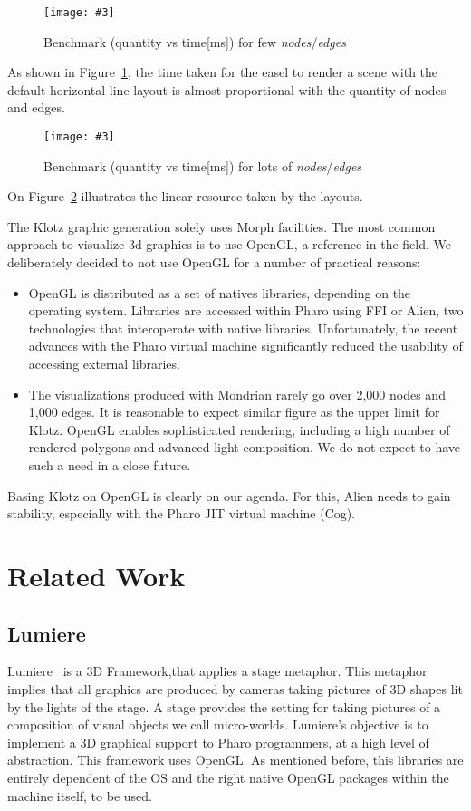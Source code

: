 \documentclass{sig-alternate}
\newcommand{\ab}[1]{\nb{Alexandre}{blue}{#1}}
\newcommand{\fig}[4]{
	\begin{figure}[#1]
		\centering
		\texttt{[image: \#3]}
		\caption{\label{fig:#3}#4}
	\end{figure}}
\newcommand{\seclabel}[1]{\label{sec:#1}}
\newcommand{\figref}[1]{Figure~\ref{fig:#1}}
\begin{document}
\fig{}{0.5}{graph1}{Benchmark (quantity vs time[ms]) for few \emph{nodes}/\emph{edges}} 

As shown in \figref{graph1}, the time taken for the easel to render a scene with the default horizontal line layout is almost proportional with the quantity of nodes and edges. %

\fig{}{0.5}{graph2}{Benchmark (quantity vs time[ms]) for lots of \emph{nodes}/\emph{edges}}

On \figref{graph2} illustrates the linear resource taken by the layouts.


The Klotz graphic generation solely uses Morph facilities. The most common approach to visualize 3d graphics is to use OpenGL, a reference in the field. We deliberately decided to not use OpenGL for a number of practical reasons:

\begin{itemize}
\item OpenGL is distributed as a set of natives libraries, depending on the operating system. Libraries are accessed within Pharo using FFI or Alien, two technologies that interoperate with native libraries. Unfortunately, the recent advances with the Pharo virtual machine significantly reduced the usability of accessing external libraries.

\item The visualizations produced with Mondrian rarely go over 2,000 nodes and 1,000 edges. It is reasonable to expect similar figure as the upper limit for Klotz. OpenGL enables sophisticated rendering, including a high number of rendered polygons and advanced light composition. We do not expect to have such a need in a close future.
\end{itemize}

Basing Klotz on OpenGL is clearly on our agenda. For this, Alien needs to gain stability, especially with the Pharo JIT virtual machine (Cog).

\section{Related Work} \seclabel{relatedwork}
\ab{need to go over this}
\subsection{Lumiere}
Lumiere~\cite{Oliv09a} is a 3D Framework,that applies a stage metaphor.
This metaphor implies that all graphics are produced by cameras
taking pictures of 3D shapes lit by the lights of the stage. A
stage provides the setting for taking pictures of a composition 
of visual objects we call micro-worlds. Lumiere's objective
is to implement a 3D graphical support to Pharo programmers, at
a high level of abstraction. This framework uses OpenGL. As mentioned before, this libraries are 
entirely dependent of the OS and the right native OpenGL packages
within the machine itself, to be used.
\end{document}
